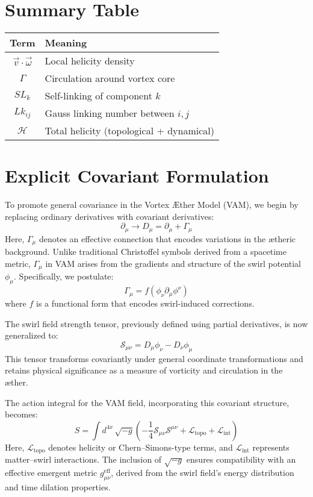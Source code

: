 \section*{Summary Table}
\begin{tabular}{|c|l|}
    \hline
    \textbf{Term} & \textbf{Meaning} \\
    \hline
    $\vec{v} \cdot \vec{\omega}$ & Local helicity density \\
    $\Gamma$ & Circulation around vortex core \\
    $SL_k$ & Self-linking of component $k$ \\
    $Lk_{ij}$ & Gauss linking number between $i,j$ \\
    $\mathcal{H}$ & Total helicity (topological + dynamical) \\
    \hline
\end{tabular}



\section{Explicit Covariant Formulation}
To promote general covariance in the Vortex Æther Model (VAM), we begin by replacing ordinary derivatives with covariant derivatives:
\begin{equation}
    \partial_\mu \rightarrow D_\mu = \partial_\mu + \Gamma_\mu
\end{equation}
Here, $\Gamma_\mu$ denotes an effective connection that encodes variations in the ætheric background. Unlike traditional Christoffel symbols derived from a spacetime metric, $\Gamma_\mu$ in VAM arises from the gradients and structure of the swirl potential $\phi_\mu$. Specifically, we postulate:
\begin{equation}
    \Gamma_\mu = f(\phi_\nu \partial_\mu \phi^\nu)
\end{equation}
where $f$ is a functional form that encodes swirl-induced corrections.

The swirl field strength tensor, previously defined using partial derivatives, is now generalized to:
\begin{equation}
    \mathcal{S}_{\mu\nu} = D_\mu \phi_\nu - D_\nu \phi_\mu
\end{equation}
This tensor transforms covariantly under general coordinate transformations and retains physical significance as a measure of vorticity and circulation in the æther.

The action integral for the VAM field, incorporating this covariant structure, becomes:
\begin{equation}
    S = \int d^{4x} \, \sqrt{-g} \left( -\frac{1}{4} \mathcal{S}_{\mu\nu} \mathcal{S}^{\mu\nu} + \mathcal{L}_{\text{topo}} + \mathcal{L}_{\text{int}} \right)
\end{equation}
Here, $\mathcal{L}_{\text{topo}}$ denotes helicity or Chern–Simons-type terms, and $\mathcal{L}_{\text{int}}$ represents matter–swirl interactions. The inclusion of $\sqrt{-g}$ ensures compatibility with an effective emergent metric $g_{\mu\nu}^{\text{eff}}$, derived from the swirl field's energy distribution and time dilation properties.

